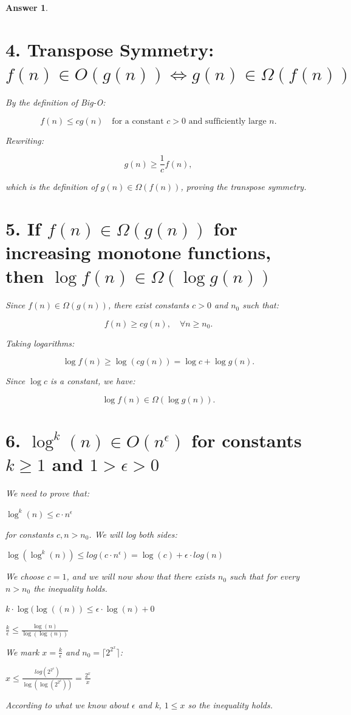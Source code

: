\documentclass[a4paper]{article}
\theoremstyle{remarksStyle}
\theoremstyle{questionStyle}
\theoremstyle{answerStyle}
\newtheorem{answer}{Answer}
\begin{document}
\begin{answer}
\section*{4. Transpose Symmetry: \( f(n) \in O(g(n)) \iff g(n) \in \Omega(f(n)) \)}

By the definition of Big-O:

\[
f(n) \leq c g(n) \quad \text{for a constant } c > 0 \text{ and sufficiently large } n.
\]

Rewriting:

\[
g(n) \geq \frac{1}{c} f(n),
\]

which is the definition of \( g(n) \in \Omega(f(n)) \), proving the transpose symmetry. 

\section*{5. If \( f(n) \in \Omega(g(n)) \) for increasing monotone functions, then \( \log f(n) \in \Omega(\log g(n)) \)}

Since \( f(n) \in \Omega(g(n)) \), there exist constants \( c > 0 \) and \( n_0 \) such that:

\[
f(n) \geq c g(n), \quad \forall n \geq n_0.
\]

Taking logarithms:

\[
\log f(n) \geq \log (c g(n)) = \log c + \log g(n).
\]

Since \( \log c \) is a constant, we have:

\[
\log f(n) \in \Omega(\log g(n)).
\]

\section*{6. \( \log^k(n) \in O(n^\epsilon) \) for constants \( k \geq 1 \) and \( 1 > \epsilon > 0 \) }
\item We need to prove that:
\item \begin{center} $\log^k(n) \leq c \cdot n ^\epsilon$ \end{center}
for constants $c, n > n_0$. We will log both sides: 
\begin{center}
$\log(\log^k(n)) \leq log(c \cdot n^ \epsilon) = \log(c) + \epsilon \cdot 
log(n)$ \end{center}
We choose $ c = 1$, and we will now show that there exists $n_0$ such
that for every $n > n_0$ the inequality holds. 
\begin{center} 
\item $k \cdot \log(\log((n)) \leq \epsilon \cdot \log(n) + 0$ 
\item $\frac{k}{\epsilon} \leq \frac{\log(n)}{\log(\log(n))}$
\end{center}
We mark $x = \frac{k}{\epsilon}$ and $n_0 = \lceil 2^{2^x} \rceil$:
\begin{center} 
\item $x \leq \frac{log(2^{2^x})}{\log(\log(2^{2^x}))} = \frac{2^x}{x}$ 
\end{center}
According to what we know about $\epsilon$ and k, $ 1 \leq x$ so the inequality holds.




\end{answer}
\end{document}
